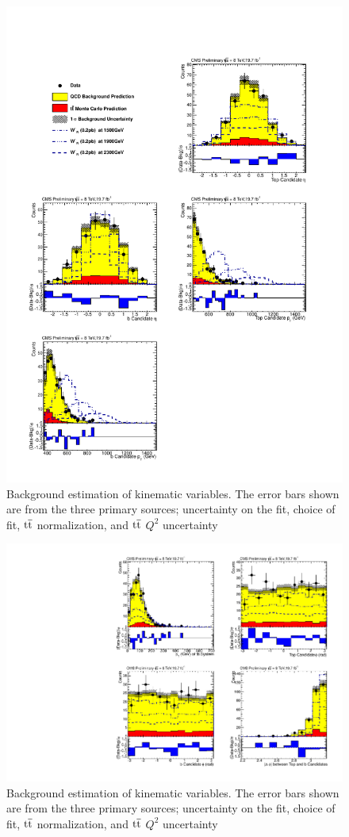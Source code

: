 \begin{figure}[htcb]
\centering
\includegraphics[width=.7\textwidth]{AN-13-004/figs/KinPlots_Data1.pdf}
\caption{Background estimation of kinematic variables.  The error bars shown are from the three primary sources; uncertainty on the fit, choice of fit, $\mathrm{t\overline{t}}$ normalization, and $\mathrm{t\overline{t}}$ $Q^2$ uncertainty}
\label{figs:kinplotsdata1}
\end{figure}  
\clearpage

\begin{figure}[htcb]
\centering
\includegraphics[width=.7\textwidth]{AN-13-004/figs/KinPlots_Data2.pdf}
\caption{Background estimation of kinematic variables.  The error bars shown are from the three primary sources; uncertainty on the fit, choice of fit, $\mathrm{t\overline{t}}$ normalization, and $\mathrm{t\overline{t}}$ $Q^2$ uncertainty}
\label{figs:kinplotsdata2}
\end{figure}  
\clearpage


